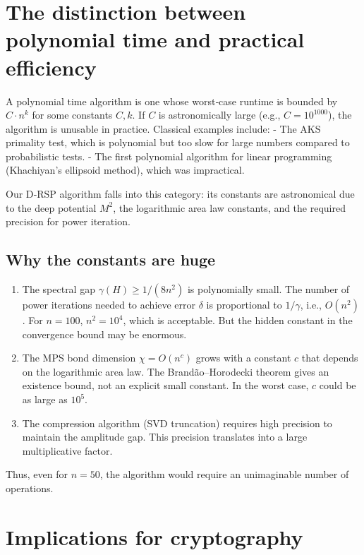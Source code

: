 \documentclass[11pt,a4paper]{article}
\begin{document}
\section{The distinction between polynomial time and practical efficiency}

A polynomial time algorithm is one whose worst‑case runtime is bounded by \(C \cdot n^k\) for some constants \(C,k\). If \(C\) is astronomically large (e.g., \(C = 10^{1000}\)), the algorithm is unusable in practice. Classical examples include:
- The AKS primality test, which is polynomial but too slow for large numbers compared to probabilistic tests.
- The first polynomial algorithm for linear programming (Khachiyan's ellipsoid method), which was impractical.

Our D‑RSP algorithm falls into this category: its constants are astronomical due to the deep potential \(M^2\), the logarithmic area law constants, and the required precision for power iteration.

\subsection{Why the constants are huge}

\begin{enumerate}
\item The spectral gap \(\gamma(H) \ge 1/(8n^2)\) is polynomially small. The number of power iterations needed to achieve error \(\delta\) is proportional to \(1/\gamma\), i.e., \(O(n^2)\). For \(n=100\), \(n^2=10^4\), which is acceptable. But the hidden constant in the convergence bound may be enormous.
\item The MPS bond dimension \(\chi = O(n^c)\) grows with a constant \(c\) that depends on the logarithmic area law. The Brandão–Horodecki theorem gives an existence bound, not an explicit small constant. In the worst case, \(c\) could be as large as \(10^5\).
\item The compression algorithm (SVD truncation) requires high precision to maintain the amplitude gap. This precision translates into a large multiplicative factor.
\end{enumerate}

Thus, even for \(n=50\), the algorithm would require an unimaginable number of operations.

\section{Implications for cryptography}
\end{document}

